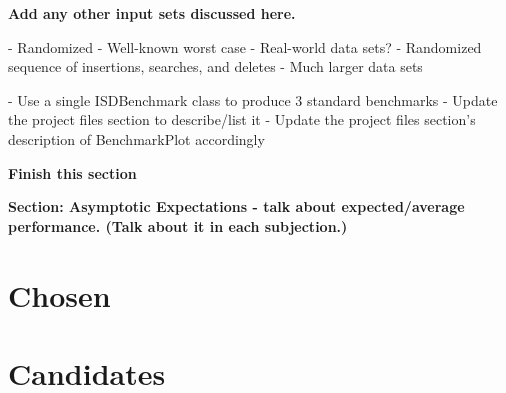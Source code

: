 \documentclass{article}
\newcommand {\todo}[1] {{\textbf{\color{red}#1}}}
\begin{document}





\todo{Add any other input sets discussed here.}


- Randomized
- Well-known worst case
- Real-world data sets?
- Randomized sequence of insertions, searches, and deletes
- Much larger data sets

- Use a single ISDBenchmark class to produce 3 standard benchmarks
- Update the project files section to describe/list it
- Update the project files section's description of BenchmarkPlot accordingly

\todo{Finish this section}

\todo{Section: Asymptotic Expectations - talk about expected/average performance. (Talk about it in each subjection.)}
\newpage

\section{Chosen}



\section{Candidates}



% 
% 
% 
% 
% 
% 
% 
\end{document}
